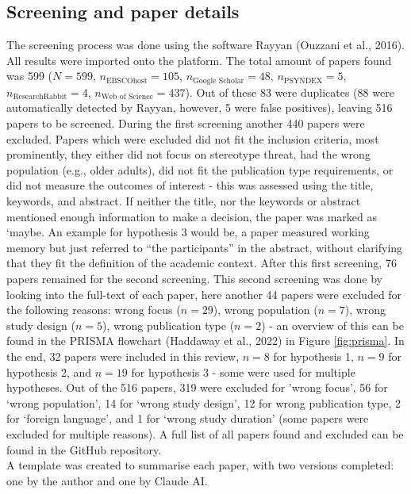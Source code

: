 \documentclass[
  stu,floatsintext]{apa7}
\begin{document}
\subsection{Screening and paper details}\label{screening-and-paper-details}

The screening process was done using the software Rayyan (Ouzzani et al., 2016). All results were imported onto the platform.
The total amount of papers found was 599 (\(N=599\), \(n_{\text{EBSCOhost}} = 105\), \(n_{\text{Google Scholar}} = 48\), \(n_{\text{PSYNDEX}} = 5\), \(n_{\text{ResearchRabbit}} = 4\), \(n_{\text{Web of Science}} = 437\)). Out of these 83 were duplicates (88 were automatically detected by Rayyan, however, 5 were false positives), leaving 516 papers to be screened. During the first screening another 440 papers were excluded.
Papers which were excluded did not fit the inclusion criteria, most prominently, they either did not focus on stereotype threat, had the wrong population (e.g., older adults), did not fit the publication type requirements, or did not measure the outcomes of interest - this was assessed using the title, keywords, and abstract. If neither the title, nor the keywords or abstract mentioned enough information to make a decision, the paper was marked as `maybe.
An example for hypothesis 3 would be, a paper measured working memory but just referred to ``the participants'' in the abstract, without clarifying that they fit the definition of the academic context. After this first screening, 76 papers remained for the second screening.
This second screening was done by looking into the full-text of each paper, here another 44 papers were excluded for the following reasons: wrong focus (\(n = 29\)), wrong population (\(n = 7\)), wrong study design (\(n = 5\)), wrong publication type (\(n = 2\)) - an overview of this can be found in the PRISMA flowchart (Haddaway et al., 2022) in Figure \ref{fig:prisma}.
In the end, 32 papers were included in this review, \(n = 8\) for hypothesis 1, \(n = 9\) for hypothesis 2, and \(n = 19\) for hypothesis 3 - some were used for multiple hypotheses. Out of the 516 papers, 319 were excluded for 'wrong focus', 56 for `wrong population', 14 for `wrong study design', 12 for wrong publication type, 2 for `foreign language', and 1 for `wrong study duration' (some papers were excluded for multiple reasons). A full list of all papers found and excluded can be found in the GitHub repository.\\
A template was created to summarise each paper, with two versions completed: one by the author and one by Claude AI.
\end{document}
